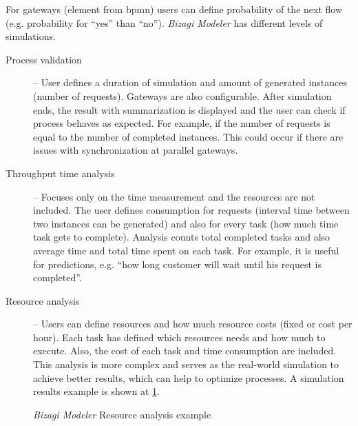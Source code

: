 For gateways (element from \gls{bpmn}) users can define probability of the next flow (e.g. probability for ``yes'' than ``no''). \textit{Bizagi Modeler} has different levels of simulations.
    \begin{description}
        \item[Process validation] -- User defines a duration of simulation and amount of generated instances (number of requests). Gateways are also configurable. After simulation ends, the result with summarization is displayed and the user can check if process behaves as expected. For example, if the number of requests is equal to the number of completed instances. This could occur if there are issues with synchronization at parallel gateways.
        \item[Throughput time analysis] -- Focuses only on the time measurement and the resources are not included. The user defines consumption for requests (interval time between two instances can be generated) and also for every task (how much time task gets to complete). Analysis counts total completed tasks and also average time and total time spent on each task. For example, it is useful for predictions, e.g. ``how long customer will wait until his request is completed''.
        \item[Resource analysis] -- Users can define resources and how much resource costs (fixed or cost per hour). Each task has defined which resources needs and how much to execute. Also, the cost of each task and time consumption are included. This analysis is more complex and serves as the real-world simulation to achieve better results, which can help to optimize processes. A simulation results example is shown at \cref{fig:bizagi-example}.
    \end{description}

\begin{figure}[ht!]
    \centering
    \qquad
    \caption{\textit{Bizagi Modeler} Resource analysis example \cite{bizagi-user-guide}}%
    \label{fig:bizagi-example}%
\end{figure}

